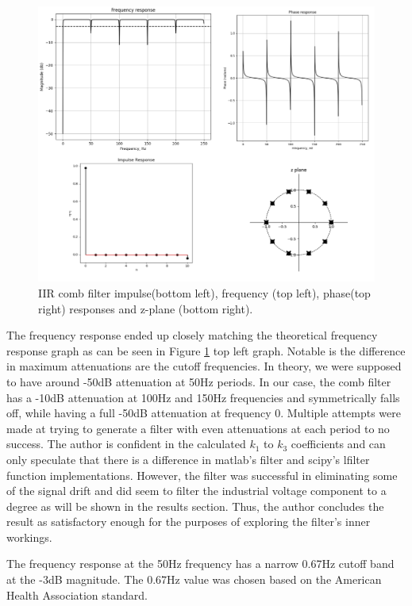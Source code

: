 \documentclass[10pt,a4paper,twocolumn]{article}
\begin{document}
\begin{figure} %
	[!h]
	\centering
	\includegraphics*[width=.8\columnwidth]{iir_char.png} %
	\caption{IIR comb filter impulse(bottom left), frequency (top left), phase(top right) responses and z-plane (bottom right).}
	\label{f_iir_ch}
	\vspace{6pt}
\end{figure}



The frequency response ended up closely matching the theoretical frequency response graph as can be seen in Figure \ref{f_iir_ch} top left graph. Notable is the difference in maximum attenuations are the cutoff frequencies. In theory, we were supposed to have around -50dB attenuation at 50Hz periods. In our case, the comb filter has a -10dB attenuation at 100Hz and 150Hz frequencies and symmetrically falls off, while having a full -50dB attenuation at frequency 0. Multiple attempts were made at trying to generate a filter with even attenuations at each period to no success. The author is confident in the calculated $k_1$ to $k_3$ coefficients and can only speculate that there is a difference in matlab's filter and scipy's lfilter function implementations. However, the filter was successful in eliminating some of the signal drift and did seem to filter the industrial voltage component to a degree as will be shown in the results section. Thus, the author concludes the result as satisfactory enough for the purposes of exploring the filter's inner workings.


The frequency response at the 50Hz frequency has a narrow 0.67Hz cutoff band at the -3dB magnitude. The 0.67Hz value was chosen based on the American Health Association standard.
\end{document}
